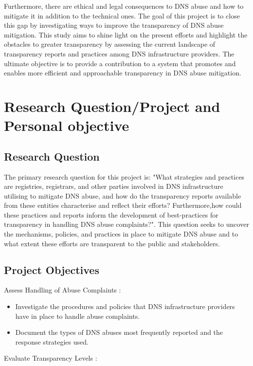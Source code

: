 Furthermore, there are ethical and legal consequences to DNS abuse and how to mitigate it in addition to the technical ones. The goal of this project is to close this gap by investigating ways to improve the transparency of DNS abuse mitigation. This study aims to shine light on the present efforts and highlight the obstacles to greater transparency by assessing the current landscape of transparency reports and practices among DNS infrastructure providers. The ultimate objective is to provide a contribution to a system that promotes and enables more efficient and approachable transparency in DNS abuse mitigation.


\section{Research Question/Project and Personal objective} 
\subsection{Research Question}

The primary research question for this project is: "What strategies and practices are registries, registrars, and other parties involved in DNS infrastructure utilising to mitigate DNS abuse, and how do the transparency reports available from these entities characterise and reflect their efforts? Furthermore,how could these practices and reports inform the development of best-practices for transparency in handling DNS abuse complaints?". This question seeks to uncover the mechanisms, policies, and practices in place to mitigate DNS abuse and to what extent these efforts are transparent to the public and stakeholders.

\subsection{Project Objectives}

Assess Handling of Abuse Complaints :

\begin{itemize}
  \item Investigate the procedures and policies that DNS infrastructure providers have in place to handle abuse complaints.
  \item Document the types of DNS abuses most frequently reported and the response strategies used.
\end{itemize}

Evaluate Transparency Levels :

